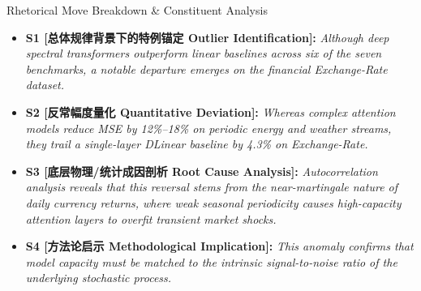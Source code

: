 \begin{TipBox}{Rhetorical Move Breakdown \& Constituent Analysis}
\begin{itemize}[leftmargin=1.5em]
  \item \textbf{S1 [总体规律背景下的特例锚定 Outlier Identification]:} \textit{Although deep spectral transformers outperform linear baselines across six of the seven benchmarks, a notable departure emerges on the financial Exchange-Rate dataset.}\par{}
  \item \textbf{S2 [反常幅度量化 Quantitative Deviation]:} \textit{Whereas complex attention models reduce MSE by 12\%--18\% on periodic energy and weather streams, they trail a single-layer DLinear baseline by 4.3\% on Exchange-Rate.}\par{}
  \item \textbf{S3 [底层物理/统计成因剖析 Root Cause Analysis]:} \textit{Autocorrelation analysis reveals that this reversal stems from the near-martingale nature of daily currency returns, where weak seasonal periodicity causes high-capacity attention layers to overfit transient market shocks.}\par{}
  \item \textbf{S4 [方法论启示 Methodological Implication]:} \textit{This anomaly confirms that model capacity must be matched to the intrinsic signal-to-noise ratio of the underlying stochastic process.}\par{}
\end{itemize}
\end{TipBox}
\medskip
\clearpage
